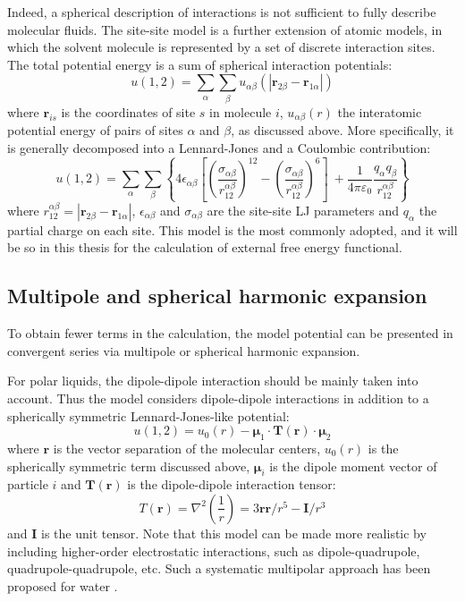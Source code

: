 Indeed, a spherical description of interactions is not sufficient
to fully describe molecular fluids. The site-site model is a further
extension of atomic models, in which the solvent molecule is represented
by a set of discrete interaction sites. The total potential energy
is a sum of spherical interaction potentials:
\begin{equation}
u(1,2)=\sum_{\alpha}\sum_{\beta}u_{\alpha\beta}(\left|\mathbf{r}_{2\beta}-\mathbf{r}_{1\alpha}\right|)
\end{equation}
where $\mathbf{r}_{is}$ is the coordinates of site $s$ in molecule
$i$, $u_{\alpha\beta}(r)$ the interatomic potential energy of pairs
of sites $\alpha$ and $\beta$, as discussed above. More specifically,
it is generally decomposed into a Lennard-Jones and a Coulombic contribution:
\begin{equation}
u(1,2)=\sum_{\alpha}\sum_{\beta}\left\{ 4\epsilon_{\alpha\beta}\left[\left(\frac{\sigma_{\alpha\beta}}{r_{12}^{\alpha\beta}}\right)^{12}-\left(\frac{\sigma_{\alpha\beta}}{r_{12}^{\alpha\beta}}\right)^{6}\right]\:+\frac{1}{4\pi\varepsilon_{0}}\frac{q_{\alpha}q_{\beta}}{r_{12}^{\alpha\beta}}\right\} 
\end{equation}
where $r_{12}^{\alpha\beta}=\left|\mathbf{r}_{2\beta}-\mathbf{r}_{1\alpha}\right|$,
$\epsilon_{\alpha\beta}$ and $\sigma_{\alpha\beta}$ are the site-site
LJ parameters and $q_{\alpha}$ the partial charge on each site. This
model is the most commonly adopted, and it will be so in this thesis
for the calculation of external free energy functional.

\subsection{Multipole and spherical harmonic expansion}

To obtain fewer terms in the calculation, the model potential can
be presented in convergent series via multipole or spherical harmonic
expansion.

For polar liquids, the dipole-dipole interaction should be mainly
taken into account. Thus the model considers dipole-dipole interactions
in addition to a spherically symmetric Lennard-Jones-like potential:
\begin{equation}
u(1,2)=u_{0}(r)-\boldsymbol{\mu}_{1}\cdot\mathbf{T}(\mathbf{r})\cdot\boldsymbol{\mu}_{2}
\end{equation}
where $\mathbf{r}$ is the vector separation of the molecular centers,
$u_{0}(r)$ is the spherically symmetric term discussed above, $\boldsymbol{\mu}_{i}$
is the dipole moment vector of particle $i$ and $\mathbf{T}(\mathbf{r})$
is the dipole-dipole interaction tensor:
\begin{equation}
T(\mathbf{r})=\nabla^{2}\left(\dfrac{1}{r}\right)=3\mathbf{r}\mathbf{r}/r^{5}-\mathbf{I}/r^{3}
\end{equation}
and $\mathbf{I}$ is the unit tensor. Note that this model can be
made more realistic by including higher-order electrostatic interactions,
such as dipole-quadrupole, quadrupole-quadrupole, etc. Such a systematic
multipolar approach has been proposed for water \citep{Chowdhuri_2006}.

